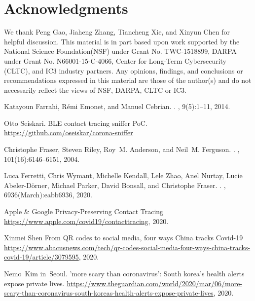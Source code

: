 \documentclass[11pt]{article}  %
\begin{document}
\section*{Acknowledgments}
We thank Peng Gao, Jiaheng Zhang, Tiancheng Xie, and Xinyun Chen for helpful discussion. This material is in part based upon work supported by the National Science Foundation(NSF) under Grant No. TWC-1518899, DARPA under Grant No. N66001-15-C-4066, Center for Long-Term Cybersecurity (CLTC), and IC3 industry partners. Any opinions, findings, and conclusions or recommendations expressed in this material are those of the author(s) and do not necessarily reflect the views of NSF, DARPA, CLTC or IC3.


\begin{thebibliography}{10}
\itemsep=1pt
\begin{small}

Katayoun Farrahi, R{\'{e}}mi Emonet, and Manuel Cebrian.
.
, 9(5):1--11, 2014.

 Otto Seiskari. \newblock
 BLE contact tracing sniffer PoC. \newblock \url{https://github.com/oseiskar/corona-sniffer} 
 
Christophe Fraser, Steven Riley, Roy~M. Anderson, and Neil~M. Ferguson. 
.
, 101(16):6146--6151, 2004.

Luca Ferretti, Chris Wymant, Michelle Kendall, Lele Zhao, Anel Nurtay, Lucie
  Abeler-D{\"{o}}rner, Michael Parker, David Bonsall, and Christophe Fraser.
.
, 6936(March):eabb6936, 2020.

 Apple \& Google
\newblock Privacy-Preserving Contact Tracing
\newblock \url{https://www.apple.com/covid19/contacttracing}, 2020.

 Xinmei Shen
\newblock From QR codes to social media, four ways China tracks Covid-19
\newblock \url{https://www.abacusnews.com/tech/qr-codes-social-media-four-ways-china-tracks-covid-19/article/3079595}, 2020.

Nemo~Kim in~Seoul.
\newblock 'more scary than coronavirus': South korea's health alerts expose
  private lives.
\newblock
  \url{https://www.theguardian.com/world/2020/mar/06/more-scary-than-coronavirus-south-koreas-health-alerts-expose-private-lives},
  2020.


\end{small}
\end{thebibliography}
\end{document}
